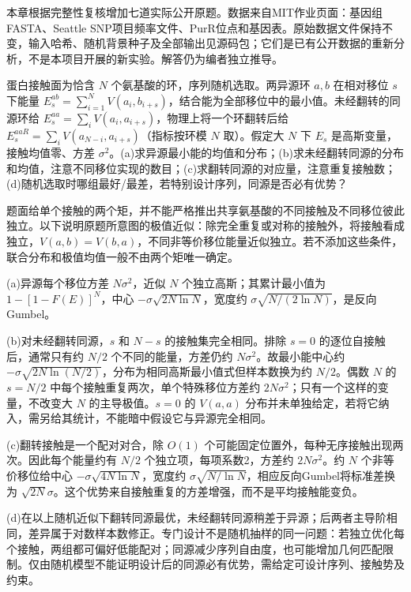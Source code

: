 本章根据完整性复核增加七道实际公开原题。数据来自MIT作业页面：基因组FASTA、Seattle SNP项目频率文件、PurR位点和基因表。原始数据文件保持不变，输入哈希、随机背景种子及全部输出见源码包；它们是已有公开数据的重新分析，不是本项目开展的新实验。解答仍为编者独立推导。

\begin{exercise}
蛋白接触面为恰含 $N$ 个氨基酸的环，序列随机选取。两异源环 $a,b$ 在相对移位 $s$ 下能量 $E_s^{ab}=\sum_{i=1}^NV(a_i,b_{i+s})$，结合能为全部移位中的最小值。未经翻转的同源环给 $E_s^{aa}=\sum_iV(a_i,a_{i+s})$，物理上将一个环翻转后给 $E_s^{aaR}=\sum_iV(a_{N-i},a_{i+s})$（指标按环模 $N$ 取）。假定大 $N$ 下 $E_s$ 是高斯变量，接触均值零、方差 $\sigma^2$。(a)求异源最小能的均值和分布；(b)求未经翻转同源的分布和均值，注意不同移位实现的数目；(c)求翻转同源的对应量，注意重复接触数；(d)随机选取时哪组最好/最差，若特别设计序列，同源是否必有优势？
\end{exercise}
\begin{solution}
题面给单个接触的两个矩，并不能严格推出共享氨基酸的不同接触及不同移位彼此独立。以下说明原题所意图的极值近似：除完全重复或对称的接触外，将接触看成独立，$V(a,b)=V(b,a)$，不同非等价移位能量近似独立。若不添加这些条件，联合分布和极值均值一般不由两个矩唯一确定。

(a)异源每个移位方差 $N\sigma^2$，近似 $N$ 个独立高斯；其累计最小值为 $1-[1-F(E)]^N$，中心 $-\sigma\sqrt{2N\ln N}$，宽度约 $\sigma\sqrt{N/(2\ln N)}$，是反向Gumbel。

(b)对未经翻转同源，$s$ 和 $N-s$ 的接触集完全相同。排除 $s=0$ 的逐位自接触后，通常只有约 $N/2$ 个不同的能量，方差仍约 $N\sigma^2$。故最小能中心约 $-\sigma\sqrt{2N\ln(N/2)}$，分布为相同高斯最小值式但样本数换为约 $N/2$。偶数 $N$ 的 $s=N/2$ 中每个接触重复两次，单个特殊移位方差约 $2N\sigma^2$；只有一个这样的变量，不改变大 $N$ 的主导极值。$s=0$ 的 $V(a,a)$ 分布并未单独给定，若将它纳入，需另给其统计，不能暗中假设它与异源完全相同。

(c)翻转接触是一个配对对合，除 $O(1)$ 个可能固定位置外，每种无序接触出现两次。因此每个能量约有 $N/2$ 个独立项，每项系数2，方差约 $2N\sigma^2$。约 $N$ 个非等价移位给中心 $-\sigma\sqrt{4N\ln N}$，宽度约 $\sigma\sqrt{N/\ln N}$，相应反向Gumbel将标准差换为 $\sqrt{2N}\sigma$。这个优势来自接触重复的方差增强，而不是平均接触能变负。

(d)在以上随机近似下翻转同源最优，未经翻转同源稍差于异源；后两者主导阶相同，差异属于对数样本数修正。专门设计不是随机抽样的同一问题：若独立优化每个接触，两组都可偏好低能配对；同源减少序列自由度，也可能增加几何匹配限制。仅由随机模型不能证明设计后的同源必有优势，需给定可设计序列、接触势及约束。
\end{solution}


